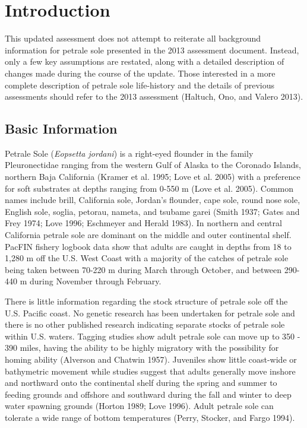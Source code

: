 \documentclass[11pt,
  english,
  letterpaper,
]{article}
\begin{document}
\hypertarget{introduction}{%
\section{Introduction}\label{introduction}}

This updated assessment does not attempt to reiterate all background information for petrale sole presented in the 2013 assessment document. Instead, only a few key assumptions are restated, along with a detailed description of changes made during the course of the update. Those interested in a more complete description of petrale sole life-history and the details of previous assessments should refer to the 2013 assessment (Haltuch, Ono, and Valero 2013).

\hypertarget{basic-information}{%
\subsection{Basic Information}\label{basic-information}}

Petrale Sole (\emph{Eopsetta jordani}) is a right-eyed flounder in the family Pleuronectidae ranging from the western Gulf of Alaska to the Coronado Islands, northern Baja California (Kramer et al. 1995; Love et al. 2005) with a preference for soft substrates at depths ranging from 0-550 m (Love et al. 2005). Common names include brill, California sole, Jordan's flounder, cape sole, round nose sole, English sole, soglia, petorau, nameta, and tsubame garei (Smith 1937; Gates and Frey 1974; Love 1996; Eschmeyer and Herald 1983). In northern and central California petrale sole are dominant on the middle and outer continental shelf. PacFIN fishery logbook data show that adults are caught in depths from 18 to 1,280 m off the U.S. West Coast with a majority of the catches of petrale sole being taken between 70-220 m during March through October, and between 290-440 m during November through February.

There is little information regarding the stock structure of petrale sole off the U.S. Pacific coast. No genetic research has been undertaken for petrale sole and there is no other published research indicating separate stocks of petrale sole within U.S. waters. Tagging studies show adult petrale sole can move up to 350 - 390 miles, having the ability to be highly migratory with the possibility for homing ability (Alverson and Chatwin 1957). Juveniles show little coast-wide or bathymetric movement while studies suggest that adults generally move inshore and northward onto the continental shelf during the spring and summer to feeding grounds and offshore and southward during the fall and winter to deep water spawning grounds (Horton 1989; Love 1996). Adult petrale sole can tolerate a wide range of bottom temperatures (Perry, Stocker, and Fargo 1994).
\end{document}
